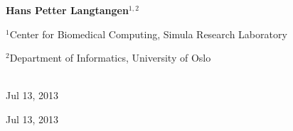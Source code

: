 \documentclass[%
oneside,                 %
final,                   %
10pt]{article}
\begin{document}
\begin{center}
\author{Hans Petter Langtangen}

\begin{center}
{\bf Hans Petter Langtangen${}^{1, 2}$} \\ [0mm]
\end{center}

\begin{center}
\centerline{{\small ${}^1$Center for Biomedical Computing, Simula Research Laboratory}}
\centerline{{\small ${}^2$Department of Informatics, University of Oslo}}
\end{center}


\date{Jul 13, 2013}
\maketitle
\date{Jul 13, 2013
}

\ \\ [10mm]
{\large\textsf{Jul 13, 2013}}

\end{center}
\vfill
\clearpage

\begin{center}
Jul 13, 2013
\end{center}

\vspace{1cm}

\end{document}
